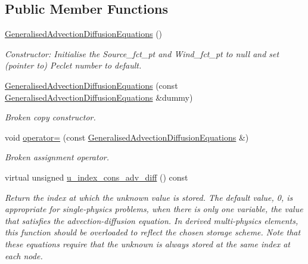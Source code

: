 \subsection*{Public Member Functions}
\begin{DoxyCompactItemize}
\item 
\hyperlink{classoomph_1_1GeneralisedAdvectionDiffusionEquations_a396bf7221fdeddac42b41599ba81e9f3}{Generalised\+Advection\+Diffusion\+Equations} ()
\begin{DoxyCompactList}\small\item\em Constructor\+: Initialise the Source\+\_\+fct\+\_\+pt and Wind\+\_\+fct\+\_\+pt to null and set (pointer to) Peclet number to default. \end{DoxyCompactList}\item 
\hyperlink{classoomph_1_1GeneralisedAdvectionDiffusionEquations_aef7658dd59b51751779fbae3197a82fe}{Generalised\+Advection\+Diffusion\+Equations} (const \hyperlink{classoomph_1_1GeneralisedAdvectionDiffusionEquations}{Generalised\+Advection\+Diffusion\+Equations} \&dummy)
\begin{DoxyCompactList}\small\item\em Broken copy constructor. \end{DoxyCompactList}\item 
void \hyperlink{classoomph_1_1GeneralisedAdvectionDiffusionEquations_aaaf6bd002cd50464a9e6087f8f58e65d}{operator=} (const \hyperlink{classoomph_1_1GeneralisedAdvectionDiffusionEquations}{Generalised\+Advection\+Diffusion\+Equations} \&)
\begin{DoxyCompactList}\small\item\em Broken assignment operator. \end{DoxyCompactList}\item 
virtual unsigned \hyperlink{classoomph_1_1GeneralisedAdvectionDiffusionEquations_a95e7c3bb9ff924a284fd83850f464967}{u\+\_\+index\+\_\+cons\+\_\+adv\+\_\+diff} () const
\begin{DoxyCompactList}\small\item\em Return the index at which the unknown value is stored. The default value, 0, is appropriate for single-\/physics problems, when there is only one variable, the value that satisfies the advection-\/diffusion equation. In derived multi-\/physics elements, this function should be overloaded to reflect the chosen storage scheme. Note that these equations require that the unknown is always stored at the same index at each node. \end{DoxyCompactList}\item 

\end{DoxyCompactItemize}
